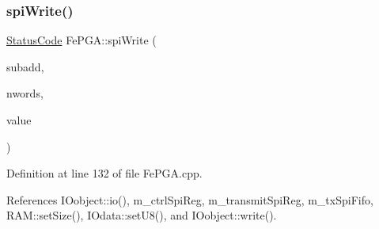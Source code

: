 \subsubsection{\texorpdfstring{spi\+Write()}{spiWrite()}\hspace{0.1cm}{\footnotesize\ttfamily [2/3]}}
{\footnotesize\ttfamily \hyperlink{classStatusCode}{Status\+Code} Fe\+P\+G\+A\+::spi\+Write (\begin{DoxyParamCaption}\item[{unsigned int}]{subadd,  }\item[{unsigned int}]{nwords,  }\item[{Py\+Object $\ast$}]{value }\end{DoxyParamCaption})}



Definition at line 132 of file Fe\+P\+G\+A.\+cpp.



References I\+Oobject\+::io(), m\+\_\+ctrl\+Spi\+Reg, m\+\_\+transmit\+Spi\+Reg, m\+\_\+tx\+Spi\+Fifo, R\+A\+M\+::set\+Size(), I\+Odata\+::set\+U8(), and I\+Oobject\+::write().


